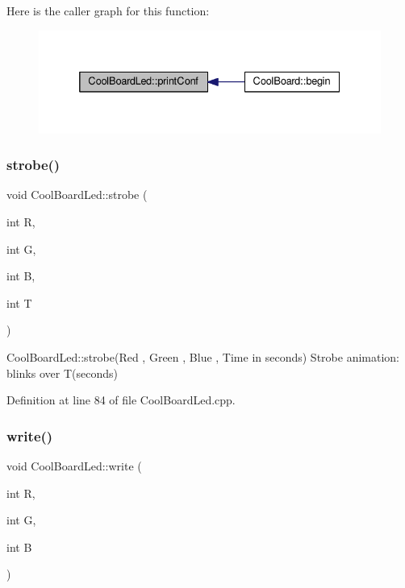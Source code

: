 Here is the caller graph for this function\+:\nopagebreak
\begin{figure}[H]
\begin{center}
\leavevmode
\includegraphics[width=332pt]{class_cool_board_led_a8ed3053a36f0ed4a131f43b5b17efb61_icgraph}
\end{center}
\end{figure}
\mbox{\label{class_cool_board_led_adc08c0ac07473499971c503d300f0413}} 
\subsubsection{\texorpdfstring{strobe()}{strobe()}}
{\footnotesize\ttfamily void Cool\+Board\+Led\+::strobe (\begin{DoxyParamCaption}\item[{int}]{R,  }\item[{int}]{G,  }\item[{int}]{B,  }\item[{int}]{T }\end{DoxyParamCaption})}

Cool\+Board\+Led\+::strobe(\+Red , Green , Blue , Time in seconds) Strobe animation\+: blinks over T(seconds) 

Definition at line 84 of file Cool\+Board\+Led.\+cpp.

\mbox{\label{class_cool_board_led_a30fadd4cbec17ceea428bf7a32207e87}} 
\subsubsection{\texorpdfstring{write()}{write()}}
{\footnotesize\ttfamily void Cool\+Board\+Led\+::write (\begin{DoxyParamCaption}\item[{int}]{R,  }\item[{int}]{G,  }\item[{int}]{B }\end{DoxyParamCaption})}

